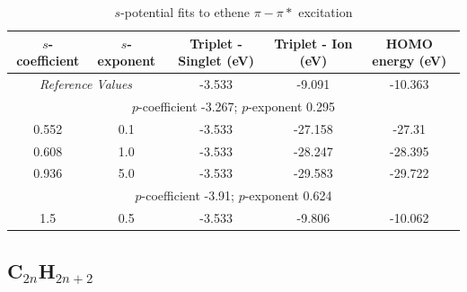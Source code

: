 \documentclass[journal=jctcce,manuscript=article]{achemso}
\begin{document}
\begin{table}[ht]
\caption{\(s\)-potential fits to ethene \(\pi-\pi*\) excitation}
\begin{tabular}{c c c c c}
\hline
\(s\)-coefficient & \(s\)-exponent & Triplet - Singlet (eV) & Triplet - Ion (eV) & HOMO energy (eV) \\
\hline
\multicolumn{2}{c}{\textit{Reference Values}} & -3.533 & -9.091 & -10.363 \\
\hline
\multicolumn{5}{c}{\(p\)-coefficient -3.267; \(p\)-exponent 0.295} \\
\hline
0.552 & 0.1 & -3.533 & -27.158 & -27.31 \\
0.608 & 1.0 & -3.533 & -28.247 & -28.395 \\
0.936 & 5.0 & -3.533 & -29.583 & -29.722 \\
\hline
\multicolumn{5}{c}{\(p\)-coefficient -3.91; \(p\)-exponent 0.624} \\
\hline
1.5 & 0.5 & -3.533 & -9.806 & -10.062 \\
\hline
\end{tabular}
\label{table:ethene_excitations}
\end{table}

\subsection{C\(_{2n}\)H\(_{2n+2}\)}
\end{document}
